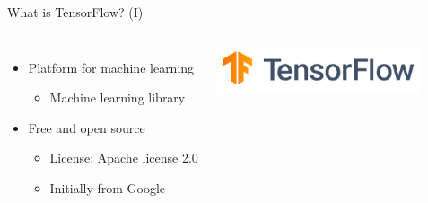 \begin{frame}{What is TensorFlow? (I)}
    \begin{columns}[T]
            \vspace{1cm}
            \begin{itemize}
                \item Platform for machine learning
                \begin{itemize}
                    \item Machine learning library
                \end{itemize}
                \item Free and open source
                \begin{itemize}
                    \item License: Apache license 2.0
                    \item Initially from Google
                \end{itemize}
            \end{itemize}
        
             \vspace{-.1cm}
             \hspace*{-6cm}
             \includegraphics[width=6cm]{assets/TensorFlow_logo_tp.png}
    \end{columns}
\end{frame}

